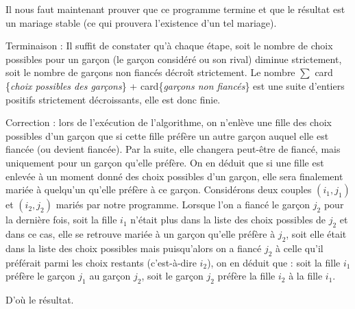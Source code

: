 

Il nous faut maintenant prouver que ce programme termine et que le résultat est un mariage stable (ce qui prouvera l'existence d'un tel mariage).
\medskip

Terminaison : Il suffit de constater qu'à chaque étape, soit le nombre de choix possibles pour un garçon (le garçon considéré ou son rival) diminue strictement, soit le nombre de garçons non fiancés décroît strictement. Le nombre $\sum$ card \{\textit{choix possibles des garçons}\} + card\{\textit{garçons non fiancés}\} est une suite d'entiers positifs strictement décroissants, elle est donc finie.
\medskip

Correction : lors de l'exécution de l'algorithme, on n'enlève une fille des choix possibles d'un garçon que si cette fille préfère un autre garçon auquel elle est fiancée (ou devient fiancée). Par la suite, elle changera peut-être de fiancé, mais uniquement pour un garçon qu'elle préfère. On en déduit que si une fille est enlevée à un moment donné des choix possibles d'un garçon, elle sera finalement mariée à quelqu'un qu'elle préfère à ce garçon. Considérons deux couples $(i_1,j_1)$ et $(i_2,j_2)$ mariés par notre programme. Lorsque l'on a fiancé le garçon $j_2$ pour la dernière fois, soit la fille $i_1$ n'était plus dans la liste des choix possibles de $j_2$ et dans ce cas, elle se retrouve mariée à un garçon qu'elle préfère à $j_2$, soit elle était dans la liste des choix possibles mais puisqu'alors on a fiancé $j_2$ à celle qu'il préférait parmi les choix restants (c'est-à-dire $i_2$), on en déduit que : soit la fille $i_1$ préfère le garçon $j_1$ au garçon $j_2$, soit le garçon $j_2$ préfère la fille $i_2$ à la fille $i_1$.
\medskip

D'où le résultat.
\bigskip

\Fin
